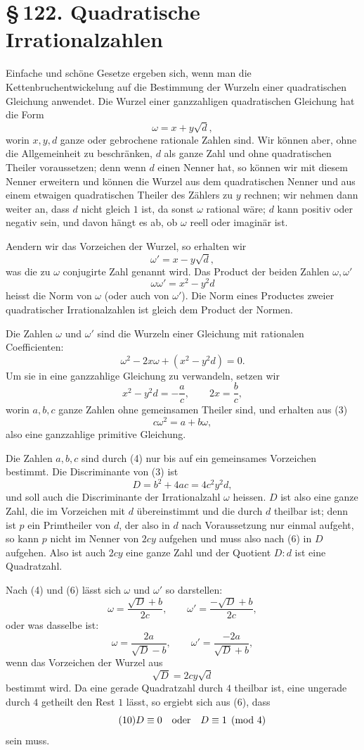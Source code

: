 \documentclass[11pt]{article}
\providecommand{\sect}[2]{\section*{\S\,#1. #2}}
\begin{document}
\sect{122}{Quadratische Irrationalzahlen}

Einfache und schöne Gesetze ergeben sich, wenn man die Kettenbruchentwickelung auf die Bestimmung der Wurzeln einer quadratischen Gleichung anwendet. Die Wurzel einer ganzzahligen quadratischen Gleichung hat die Form
\[
\tag{1}        \omega=x+y\sqrt d,
\]
worin $x,y,d$ ganze oder gebrochene rationale Zahlen sind. Wir können aber, ohne die Allgemeinheit zu beschränken, $d$ als ganze Zahl und ohne quadratischen Theiler voraussetzen; denn wenn $d$ einen Nenner hat, so können wir mit diesem Nenner erweitern und können die Wurzel aus dem quadratischen Nenner und aus einem etwaigen quadratischen Theiler des Zählers zu $y$ rechnen; wir nehmen dann weiter an, dass $d$ nicht gleich $1$ ist, da sonst $\omega$ rational wäre; $d$ kann positiv oder negativ sein, und davon hängt es ab, ob $\omega$ reell oder imaginär ist.

Aendern wir das Vorzeichen der Wurzel, so erhalten wir
\[
\tag{2}        \omega'=x-y\sqrt d,
\]
was die zu $\omega$ conjugirte Zahl genannt wird. Das Product der beiden Zahlen $\omega,\omega'$
\[
        \omega\omega'=x^2-y^2d
\]
heisst die Norm von $\omega$ (oder auch von $\omega'$). Die Norm eines Productes zweier quadratischer Irrationalzahlen ist gleich dem Product der Normen.

Die Zahlen $\omega$ und $\omega'$ sind die Wurzeln einer Gleichung mit rationalen Coefficienten:
\[
\tag{3}        \omega^2-2x\omega+(x^2-y^2d)=0.
\]
Um sie in eine ganzzahlige Gleichung zu verwandeln, setzen wir
\[
\tag{4}        x^2-y^2d=-\frac ac,
        \qquad
        2x=\frac bc,
\]
worin $a,b,c$ ganze Zahlen ohne gemeinsamen Theiler sind, und erhalten aus (3)
\[
\tag{5}        c\omega^2=a+b\omega,
\]
also eine ganzzahlige primitive Gleichung.

Die Zahlen $a,b,c$ sind durch (4) nur bis auf ein gemeinsames Vorzeichen bestimmt. Die Discriminante von (3) ist
\[
\tag{6}        D=b^2+4ac=4c^2y^2d,
\]
und soll auch die Discriminante der Irrationalzahl $\omega$ heissen. $D$ ist also eine ganze Zahl, die im Vorzeichen mit $d$ übereinstimmt und die durch $d$ theilbar ist; denn ist $p$ ein Primtheiler von $d$, der also in $d$ nach Voraussetzung nur einmal aufgeht, so kann $p$ nicht im Nenner von $2cy$ aufgehen und muss also nach (6) in $D$ aufgehen. Also ist auch $2cy$ eine ganze Zahl und der Quotient $D:d$ ist eine Quadratzahl.

Nach (4) und (6) lässt sich $\omega$ und $\omega'$ so darstellen:
\[
\tag{7}        \omega=\frac{\sqrt D+b}{2c},
        \qquad
        \omega'=\frac{-\sqrt D+b}{2c},
\]
oder was dasselbe ist:
\[
\tag{8}        \omega=\frac{2a}{\sqrt D-b},
        \qquad
        \omega'=\frac{-2a}{\sqrt D+b},
\]
wenn das Vorzeichen der Wurzel aus
\[
\tag{9}        \sqrt D=2cy\sqrt d
\]
bestimmt wird. Da eine gerade Quadratzahl durch $4$ theilbar ist, eine ungerade durch $4$ getheilt den Rest $1$ lässt, so ergiebt sich aus (6), dass
\[
\tag{10}       D\equiv0\quad\hbox{oder}\quad D\equiv1\pmod4
\]
sein muss.
\end{document}
